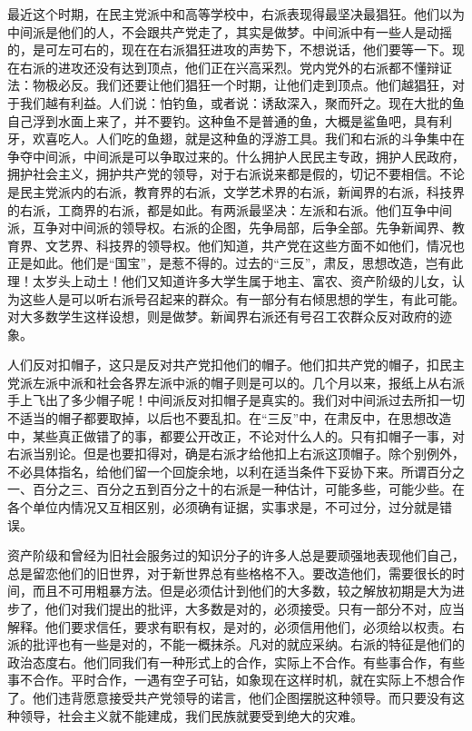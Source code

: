 最近这个时期，在民主党派中和高等学校中，右派表现得最坚决最猖狂。他们以为中间派是他们的人，不会跟共产党走了，其实是做梦。中间派中有一些人是动摇的，是可左可右的，现在在右派猖狂进攻的声势下，不想说话，他们要等一下。现在右派的进攻还没有达到顶点，他们正在兴高采烈。党内党外的右派都不懂辩证法：物极必反。我们还要让他们猖狂一个时期，让他们走到顶点。他们越猖狂，对于我们越有利益。人们说：怕钓鱼，或者说：诱敌深入，聚而歼之。现在大批的鱼自己浮到水面上来了，并不要钓。这种鱼不是普通的鱼，大概是鲨鱼吧，具有利牙，欢喜吃人。人们吃的鱼翅，就是这种鱼的浮游工具。我们和右派的斗争集中在争夺中间派，中间派是可以争取过来的。什么拥护人民民主专政，拥护人民政府，拥护社会主义，拥护共产党的领导，对于右派说来都是假的，切记不要相信。不论是民主党派内的右派，教育界的右派，文学艺术界的右派，新闻界的右派，科技界的右派，工商界的右派，都是如此。有两派最坚决：左派和右派。他们互争中间派，互争对中间派的领导权。右派的企图，先争局部，后争全部。先争新闻界、教育界、文艺界、科技界的领导权。他们知道，共产党在这些方面不如他们，情况也正是如此。他们是“国宝”，是惹不得的。过去的“三反”，肃反，思想改造，岂有此理！太岁头上动土！他们又知道许多大学生属于地主、富农、资产阶级的儿女，认为这些人是可以听右派号召起来的群众。有一部分有右倾思想的学生，有此可能。对大多数学生这样设想，则是做梦。新闻界右派还有号召工农群众反对政府的迹象。

人们反对扣帽子，这只是反对共产党扣他们的帽子。他们扣共产党的帽子，扣民主党派左派中派和社会各界左派中派的帽子则是可以的。几个月以来，报纸上从右派手上飞出了多少帽子呢！中间派反对扣帽子是真实的。我们对中间派过去所扣一切不适当的帽子都要取掉，以后也不要乱扣。在“三反”中，在肃反中，在思想改造中，某些真正做错了的事，都要公开改正，不论对什么人的。只有扣帽子一事，对右派当别论。但是也要扣得对，确是右派才给他扣上右派这顶帽子。除个别例外，不必具体指名，给他们留一个回旋余地，以利在适当条件下妥协下来。所谓百分之一、百分之三、百分之五到百分之十的右派是一种估计，可能多些，可能少些。在各个单位内情况又互相区别，必须确有证据，实事求是，不可过分，过分就是错误。

资产阶级和曾经为旧社会服务过的知识分子的许多人总是要顽强地表现他们自己，总是留恋他们的旧世界，对于新世界总有些格格不入。要改造他们，需要很长的时间，而且不可用粗暴方法。但是必须估计到他们的大多数，较之解放初期是大为进步了，他们对我们提出的批评，大多数是对的，必须接受。只有一部分不对，应当解释。他们要求信任，要求有职有权，是对的，必须信用他们，必须给以权责。右派的批评也有一些是对的，不能一概抹杀。凡对的就应采纳。右派的特征是他们的政治态度右。他们同我们有一种形式上的合作，实际上不合作。有些事合作，有些事不合作。平时合作，一遇有空子可钻，如象现在这样时机，就在实际上不想合作了。他们违背愿意接受共产党领导的诺言，他们企图摆脱这种领导。而只要没有这种领导，社会主义就不能建成，我们民族就要受到绝大的灾难。


